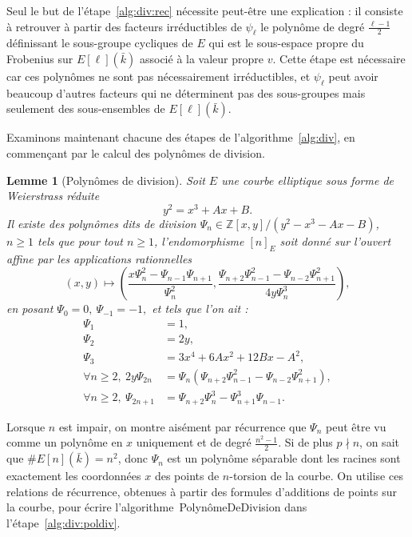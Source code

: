 \documentclass[11pt,a4paper]{article}
\newcommand{\Z}{\mathbb{Z}}
\renewcommand{\v}{\vspace{5mm}}
\newtheorem*{lem}{Lemme}
\theoremstyle{definition}
\begin{document}
\v

Seul le but de l'étape~\ref{alg:div:rec} nécessite peut-être une explication : il consiste à retrouver à partir des facteurs irréductibles de $\psi_\ell$ le polynôme de degré $\frac{\ell-1}{2}$ définissant le sous-groupe cycliques de $E$ qui est le sous-espace propre du Frobenius sur $E[\ell](\bar{k})$ associé à la valeur propre $v$. Cette étape est nécessaire car ces polynômes ne sont pas nécessairement irréductibles, et $\psi_\ell$ peut avoir beaucoup d'autres facteurs qui ne déterminent pas des sous-groupes mais seulement des sous-ensembles de $E[\ell](\bar{k})$.

Examinons maintenant chacune des étapes de l'algorithme~\ref{alg:div}, en commençant par le calcul des polynômes de division.

\begin{lem}[Polynômes de division]
Soit $E$ une courbe elliptique sous forme de Weierstrass réduite
$$y^2 = x^3 + Ax + B.$$
Il existe des polynômes dits \emph{de division} $\Psi_n \in \Z[x,y]/(y^2 - x^3 - Ax - B)$, $n\geq 1$ tels que pour tout $n\geq 1$, l'endomorphisme $[n]_E$ soit donné sur l'ouvert affine par les applications rationnelles
$$(x,y) \longmapsto \left(\frac{x\Psi_n^2 - \Psi_{n-1}\Psi_{n+1}}{\Psi_n^2},
\frac{\Psi_{n+2}\Psi_{n-1}^2 - \Psi_{n-2} \Psi_{n+1}^2}{4y \Psi_n^3}\right),$$
en posant $\Psi_0 = 0,\ \Psi_{-1} = -1,$ et tels que l'on ait :
$$\begin{aligned}
 \Psi_1&= 1,\\
 \Psi_2&= 2y,\\
 \Psi_3&= 3x^4 + 6Ax^2 + 12Bx - A^2, \\
 \forall n\geq 2,\ 2y\Psi_{2n} &= \Psi_n(\Psi_{n+2}\Psi_{n-1}^2 - \Psi_{n-2} \Psi_{n+1}^2), \\
\forall n\geq 2 ,\ \Psi_{2n+1} &= \Psi_{n+2}\Psi_n^3 - \Psi_{n+1}^3\Psi_{n-1}.
\end{aligned}$$
\end{lem}

Lorsque $n$ est impair, on montre aisément par récurrence que $\Psi_n$ peut être vu comme un polynôme en $x$ uniquement et de degré $\frac{n^2-1}{2}$. Si de plus $p\nmid n$, on sait que $\#E[n](\bar{k})=n^2$, donc $\Psi_n$ est un polynôme séparable dont les racines sont exactement les coordonnées $x$ des points de $n$-torsion de la courbe. 
On utilise ces relations de récurrence, obtenues à partir des formules d'additions de points sur la courbe, pour écrire l'algorithme~{\sc PolynômeDeDivision} dans l'étape~\ref{alg:div:poldiv}.
\v
\end{document}
